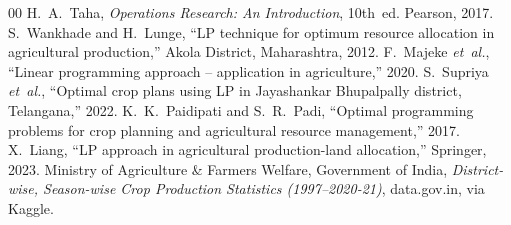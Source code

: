 \documentclass[conference]{IEEEtran}
\begin{document}
\begin{thebibliography}{00}
 H.~A.~Taha, \emph{Operations Research: An Introduction}, 10th~ed. Pearson, 2017.
 S.~Wankhade and H.~Lunge, ``LP technique for optimum resource allocation in agricultural production,'' Akola District, Maharashtra, 2012.
 F.~Majeke \textit{et~al.}, ``Linear programming approach -- application in agriculture,'' 2020.
 S.~Supriya \textit{et~al.}, ``Optimal crop plans using LP in Jayashankar Bhupalpally district, Telangana,'' 2022.
 K.~K.~Paidipati and S.~R.~Padi, ``Optimal programming problems for crop planning and agricultural resource management,'' 2017.
 X.~Liang, ``LP approach in agricultural production-land allocation,'' Springer, 2023.
 Ministry of Agriculture \& Farmers Welfare, Government of India, \emph{District-wise, Season-wise Crop Production Statistics (1997--2020-21)}, data.gov.in, via Kaggle.
\end{thebibliography}
\end{document}
